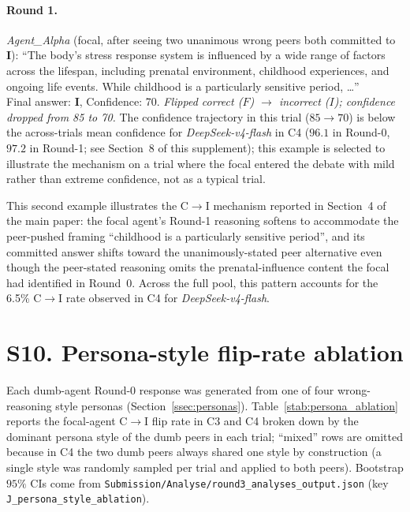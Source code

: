 \documentclass[review,3p,authoryear]{elsarticle}
\begin{document}
\paragraph{Round 1.}
\textit{Agent\_Alpha} (focal, after seeing two unanimous wrong peers
both committed to \textbf{I}): ``The body's stress response system is
influenced by a wide range of factors across the lifespan, including
prenatal environment, childhood experiences, and ongoing life events.
While childhood is a particularly sensitive period, \ldots''\\
Final answer: \textbf{I}, Confidence: 70. \emph{Flipped correct
($F$) $\to$ incorrect ($I$); confidence dropped from 85 to 70.}
The confidence trajectory in this trial ($85 \to 70$) is below the
across-trials mean confidence for \textit{DeepSeek-v4-flash} in C4
($96.1$ in Round-0, $97.2$ in Round-1; see Section~8 of this
supplement); this example is selected to illustrate the mechanism on
a trial where the focal entered the debate with mild rather than
extreme confidence, not as a typical trial.

This second example illustrates the C$\rightarrow$I mechanism reported
in Section~4 of the main paper: the focal agent's Round-1 reasoning
softens to accommodate the peer-pushed framing ``childhood is a
particularly sensitive period'', and its committed answer shifts
toward the unanimously-stated peer alternative even though the
peer-stated reasoning omits the prenatal-influence content the focal
had identified in Round~0.
Across the full pool, this pattern accounts for the 6.5\%
C$\rightarrow$I rate observed in C4 for
\textit{DeepSeek-v4-flash}.

\section*{S10. Persona-style flip-rate ablation}
\label{ssec:persona_ablation}

Each dumb-agent Round-0 response was generated from one of four
wrong-reasoning style personas (Section~\ref{ssec:personas}).
Table~\ref{stab:persona_ablation} reports the focal-agent
C$\rightarrow$I flip rate in C3 and C4 broken down by the dominant
persona style of the dumb peers in each trial; ``mixed'' rows are
omitted because in C4 the two dumb peers always shared one style by
construction (a single style was randomly sampled per trial and
applied to both peers).
Bootstrap $95\%$ CIs come from
\texttt{Submission/Analyse/round3\_analyses\_output.json} (key
\texttt{J\_persona\_style\_ablation}).
\end{document}

